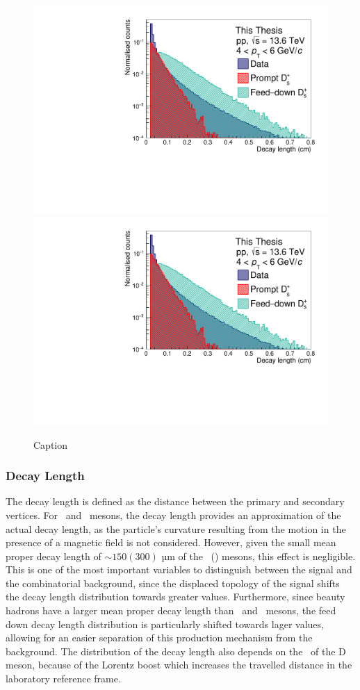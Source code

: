 \begin{figure}
    \centering
    \includegraphics[width=0.48\linewidth]{Figures/Chapter 4/DecayLength.pdf}
    \includegraphics[width=0.48\linewidth]{Figures/Chapter 4/DecayLength.pdf}
    \caption{Caption}
    \label{fig:enter-label}
\end{figure}

\subsubsection{Decay Length}
The decay length is defined as the distance between the primary and secondary vertices. For \ds\ and \dpl\ mesons, the decay length provides an approximation of the actual decay length, as the particle's curvature resulting from the motion in the presence of a magnetic field is not considered. However, given the small mean proper decay length of $\sim 150 (300)$ µm of the \ds\ (\dpl) mesons, this effect is negligible. This is one of the most important variables to distinguish between the signal and the combinatorial background, since the displaced topology of the signal shifts the decay length distribution towards greater values. Furthermore, since beauty hadrons have a larger mean proper decay length than \ds\ and \dpl\ mesons, the feed down decay length distribution is particularly shifted towards lager values, allowing for an easier separation of this production mechanism from the background.  The distribution of the decay length also depends on the \pt\ of the D meson, because of the Lorentz boost which increases the travelled distance in the laboratory reference frame. 
